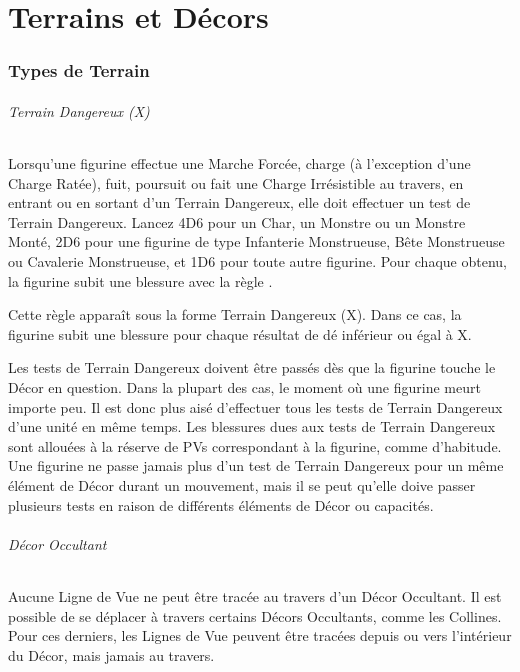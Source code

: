 
\part{Terrains et Décors}

\hypertarget{terraintypes}{\section{Types de Terrain}}
\label{terrain_types}

\hypertarget{dangerousterrain}{\paragraph{Terrain Dangereux (X)}}

Lorsqu'une figurine effectue une Marche Forcée, charge (à l'exception d'une Charge Ratée), fuit, poursuit ou fait une Charge Irrésistible au travers, en entrant ou en sortant d'un Terrain Dangereux, elle doit effectuer un test de Terrain Dangereux. Lancez 4D6 pour un Char, un Monstre ou un Monstre Monté, 2D6 pour une figurine de type Infanterie Monstrueuse, Bête Monstrueuse ou Cavalerie Monstrueuse, et 1D6 pour toute autre figurine. Pour chaque  obtenu, la figurine subit une blessure avec la règle .

Cette règle apparaît sous la forme Terrain Dangereux (X). Dans ce cas, la figurine subit une blessure pour chaque résultat de dé inférieur ou égal à X.

Les tests de Terrain Dangereux doivent être passés dès que la figurine touche le Décor en question. Dans la plupart des cas, le moment où une figurine meurt importe peu. Il est donc plus aisé d'effectuer tous les tests de Terrain Dangereux d'une unité en même temps. Les blessures dues aux tests de Terrain Dangereux sont allouées à la réserve de PVs correspondant à la figurine, comme d'habitude. Une figurine ne passe jamais plus d'un test de Terrain Dangereux pour un même élément de Décor durant un mouvement, mais il se peut qu'elle doive passer plusieurs tests en raison de différents éléments de Décor ou capacités.

\paragraph{Décor Occultant}

Aucune Ligne de Vue ne peut être tracée au travers d'un Décor Occultant. Il est possible de se déplacer à travers certains Décors Occultants, comme les Collines. Pour ces derniers, les Lignes de Vue peuvent être tracées depuis ou vers l'intérieur du Décor, mais jamais au travers. 

